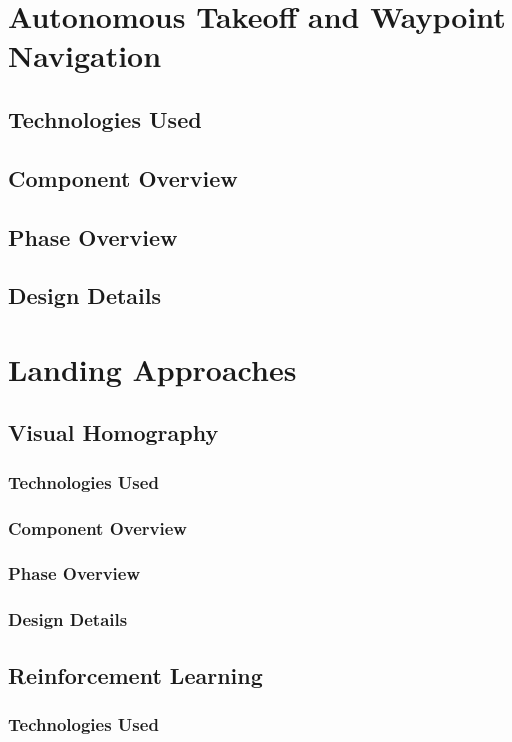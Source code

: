 \section{Autonomous Takeoff and Waypoint Navigation}
\subsection{Technologies  Used}
\subsection{Component  Overview}
\subsection{Phase Overview}
\subsection{Design Details}

\section{Landing Approaches}
\subsection{Visual Homography}
\subsubsection{Technologies  Used}
\subsubsection{Component  Overview}
\subsubsection{Phase Overview}
\subsubsection{Design Details}

\subsection{Reinforcement Learning}
\subsubsection{Technologies  Used}
